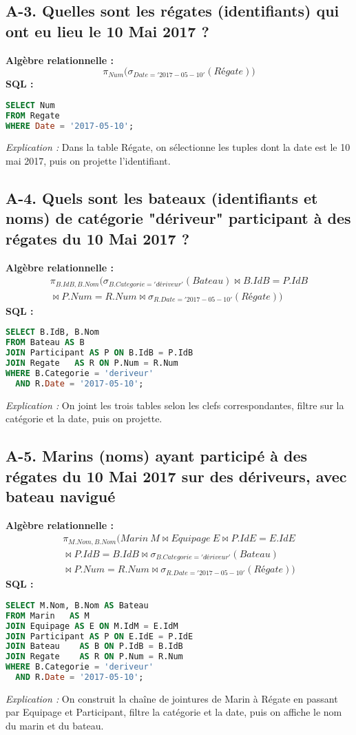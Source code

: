 \documentclass[a4paper,11pt]{article}
\begin{document}
\subsection*{A-3. Quelles sont les régates (identifiants) qui ont eu lieu le 10 Mai 2017 ?}
\textbf{Algèbre relationnelle :}
\[
  \pi_{Num}\bigl(\sigma_{Date='2017-05-10'}(Régate)\bigr)
\]
\textbf{SQL :}
\begin{lstlisting}[language=SQL]
SELECT Num
FROM Regate
WHERE Date = '2017-05-10';
\end{lstlisting}
\textit{Explication :} Dans la table Régate, on sélectionne les tuples dont la date est le 10 mai 2017, puis on projette l'identifiant.

\subsection*{A-4. Quels sont les bateaux (identifiants et noms) de cat\'egorie "d\'eriveur" participant \`a des régates du 10 Mai 2017 ?}
\textbf{Algèbre relationnelle :}
\[
\begin{array}{l}
  \pi_{B.IdB,B.Nom}\bigl(
    \sigma_{B.Categorie='dériveur'}(Bateau) \bowtie B.IdB = P.IdB \\
    \bowtie P.Num = R.Num \bowtie \sigma_{R.Date='2017-05-10'}(Régate)
  \bigr)
\end{array}
\]
\textbf{SQL :}
\begin{lstlisting}[language=SQL]
SELECT B.IdB, B.Nom
FROM Bateau AS B
JOIN Participant AS P ON B.IdB = P.IdB
JOIN Regate   AS R ON P.Num = R.Num
WHERE B.Categorie = 'deriveur'
  AND R.Date = '2017-05-10';
\end{lstlisting}
\textit{Explication :} On joint les trois tables selon les clefs correspondantes, filtre sur la catégorie et la date, puis on projette.

\subsection*{A-5. Marins (noms) ayant participé à des régates du 10 Mai 2017 sur des dériveurs, avec bateau navigué}
\textbf{Algèbre relationnelle :}
\[
\begin{array}{l}
  \pi_{M.Nom, B.Nom}\bigl(
    Marin~M \bowtie Equipage~E \bowtie P.IdE = E.IdE \\
    \bowtie P.IdB = B.IdB \bowtie \sigma_{B.Categorie='dériveur'}(Bateau) \\
    \bowtie P.Num = R.Num \bowtie \sigma_{R.Date='2017-05-10'}(Régate)
  \bigr)
  \end{array}
\]
\textbf{SQL :}
\begin{lstlisting}[language=SQL]
SELECT M.Nom, B.Nom AS Bateau
FROM Marin   AS M
JOIN Equipage AS E ON M.IdM = E.IdM
JOIN Participant AS P ON E.IdE = P.IdE
JOIN Bateau    AS B ON P.IdB = B.IdB
JOIN Regate    AS R ON P.Num = R.Num
WHERE B.Categorie = 'deriveur'
  AND R.Date = '2017-05-10';
\end{lstlisting}
\textit{Explication :} On construit la cha\^ine de jointures de Marin \`a Régate en passant par Equipage et Participant, filtre la cat\'egorie et la date, puis on affiche le nom du marin et du bateau.
\end{document}
